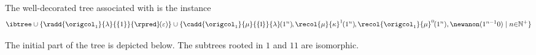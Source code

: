 
\begin{example}\label{ex:terntree}

The well-decorated tree associated with  is the instance %
\\[-4ex]

$$
\ibtree \cup \{\radd{\origcol_1}{\lambda}{\{1\}}{\rpred}\hspace{-1pt}(\varepsilon)\} \cup
\{\cadd{\origcol_1}{\mu}{\smash{\{\hspace{-1pt}1\hspace{-1pt}\}}}{\lambda}\hspace{-1pt}(1^n)\hspace{-1pt},
\recol{\mu}{\kappa}^1\hspace{-1pt}(1^n)\hspace{-1pt},
\recol{\origcol_{1}}{\mu}^0\hspace{-1pt}(1^n), \newanon(1^{n-1}0) \mid n {\in} \mathbb{N}^+\}
$$
\vspace{-1ex}

\noindent The initial part of the tree is depicted below. %
The subtrees rooted in $1$ and $11$ are isomorphic.

\vspace{-2.5ex}
\hspace{12ex}\scalebox{0.8}{
	\begin{tikzpicture}%
		[
		level 1/.style={sibling distance=60mm, level distance=12mm},
		level 2/.style={sibling distance=30mm, level distance=15mm},
		level 3/.style={sibling distance=14mm, level distance=10mm},
		]
		

\end{tikzpicture}}
\end{example}
